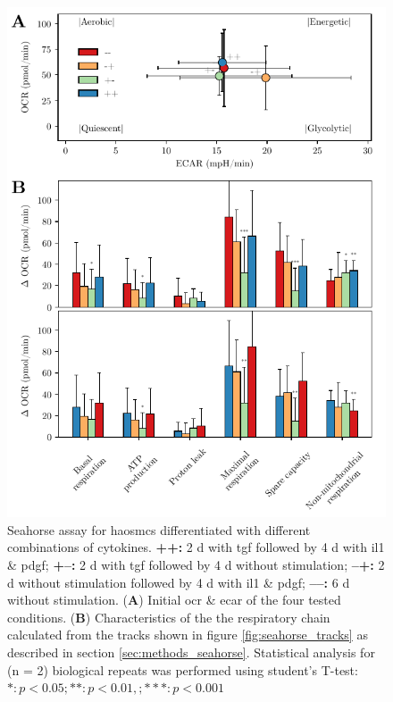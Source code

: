     \begin{figure}[h]
    \capstart
        \centering
    	\includegraphics{Abbildung/Seahorse_summary_merged.pdf}

    	\begin{minipage}{\captionwidth}
    		\caption[energy_profile]{ \newline Seahorse assay for \acp{haosmc} differentiated with different combinations of cytokines.
            \textbf{++:} 2 d with \ac{tgf} followed by 4 d with \ac{il1} \& \ac{pdgf};
            \textbf{+–:} 2 d with \ac{tgf} followed by 4 d without stimulation;
            \textbf{–+:} 2 d without stimulation followed by 4 d with \ac{il1} \& \ac{pdgf};
            \textbf{––:} 6 d without stimulation.
            (\textbf{A}) Initial \ac{ocr} \& \ac{ecar} of the four tested conditions. (\textbf{B}) Characteristics of the the respiratory chain calculated from the tracks shown in figure \ref{fig:seahorse_tracks} as described in section \ref{sec:methods_seahorse}. Statistical analysis for (n = 2) biological repeats was performed using student's T-test: $*: p < 0.05; **: p < 0.01, ; ***: p < 0.001$}
    		\label{fig:energy_profile}
    	\end{minipage}
    \end{figure}

